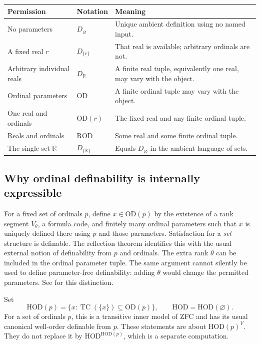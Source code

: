 \documentclass[11pt,a4paper]{article}
\numberwithin{equation}{section}
\theoremstyle{definition}
\theoremstyle{remark}
\newcommand{\OD}{\mathrm{OD}}
\newcommand{\HOD}{\mathrm{HOD}}
\newcommand{\R}{\mathbb R}
\newcommand{\TC}{\operatorname{TC}}
\newcommand{\ROD}{\mathrm{ROD}}
\begin{document}
\begin{center}
\begin{tabular}{P{0.25\textwidth}P{0.26\textwidth}P{0.39\textwidth}}
\toprule
Permission & Notation & Meaning \\
\midrule
No parameters & \(D_\varnothing\) & Unique ambient definition using no named input.\\
A fixed real \(r\) & \(D_{\{r\}}\) & That real is available; arbitrary ordinals are not.\\
Arbitrary individual reals & \(D_\R\) & A finite real tuple, equivalently one real, may vary with the object.\\
Ordinal parameters & \(\OD\) & A finite ordinal tuple may vary with the object.\\
One real and ordinals & \(\OD(r)\) & The fixed real and any finite ordinal tuple.\\
Reals and ordinals & \(\ROD\) & Some real and some finite ordinal tuple.\\
The single set \(\R\) & \(D_{\{\R\}}\) & Equals \(D_\varnothing\) in the ambient language of sets.\\
\bottomrule
\end{tabular}
\end{center}

\subsection{Why ordinal definability is internally expressible}

For a fixed set of ordinals \(p\), define \(x\in\OD(p)\) by the existence
of a rank segment \(V_\theta\), a formula code, and finitely many ordinal
parameters such that \(x\) is uniquely defined there using \(p\) and those
parameters.  Satisfaction for a \emph{set} structure is definable.  The
reflection theorem identifies this with the usual external notion of
definability from \(p\) and ordinals.  The extra rank \(\theta\) can be
included in the ordinal parameter tuple.  The same argument cannot
silently be used to define parameter-free definability: adding \(\theta\)
would change the permitted parameters.  See \cite{DoraisHamkins,HLR}
for this distinction.

Set
\[
 \HOD(p)=\{x:\TC(\{x\})\subseteq\OD(p)\},\qquad
 \HOD=\HOD(\varnothing).
\]
For a set of ordinals \(p\), this is a transitive inner model of ZFC and
has its usual canonical well-order definable from \(p\).  These statements
are about \(\HOD(p)^V\).  They do not replace it by
\(\HOD^{\HOD(p)}\), which is a separate computation.
\end{document}
